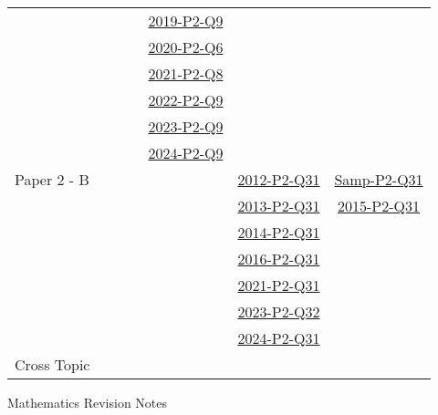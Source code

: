 \documentclass[12pt, a4paper]{article}
\begin{document}
\begin{absolutelynopagebreak}
\begin{center}
\begin{tabular}{|l|c|c|c|c|c|c|}
&  &  &  & \hyperref[DSE2019-CoreP2-Q09]{2019-P2-Q9} &  &  \\
&  &  &  & \hyperref[DSE2020-CoreP2-Q06]{2020-P2-Q6} &  &  \\
&  &  &  & \hyperref[DSE2021-CoreP2-Q08]{2021-P2-Q8} &  &  \\
&  &  &  & \hyperref[DSE2022-CoreP2-Q09]{2022-P2-Q9} &  &  \\
&  &  &  & \hyperref[DSE2023-CoreP2-Q09]{2023-P2-Q9} &  &  \\
&  &  &  & \hyperref[DSE2024-CoreP2-Q09]{2024-P2-Q9} &  &  \\
\hline
Paper 2 - B&  &  &  &  & \hyperref[DSE2012-CoreP2-Q31]{2012-P2-Q31} & \hyperref[DSE2012S-CoreP2-Q31]{Samp-P2-Q31} \\
&  &  &  &  & \hyperref[DSE2013-CoreP2-Q31]{2013-P2-Q31} & \hyperref[DSE2015-CoreP2-Q31]{2015-P2-Q31} \\
&  &  &  &  & \hyperref[DSE2014-CoreP2-Q31]{2014-P2-Q31} &  \\
&  &  &  &  & \hyperref[DSE2016-CoreP2-Q31]{2016-P2-Q31} &  \\
&  &  &  &  & \hyperref[DSE2021-CoreP2-Q31]{2021-P2-Q31} &  \\
&  &  &  &  & \hyperref[DSE2023-CoreP2-Q32]{2023-P2-Q32} &  \\
&  &  &  &  & \hyperref[DSE2024-CoreP2-Q31]{2024-P2-Q31} &  \\
\hline
\hline
Cross Topic&  &  &  &  &  &  \\
\hline
\end{tabular}
\end{center}
\end{absolutelynopagebreak}
\newpage
\newpage
\thispagestyle{empty}
\begin{center}
Mathematics Revision Notes\\\vspace{1cm}
\\\vspace{1cm}
{\fontsize{24pt}{24pt}\selectfont {Exponential Functions \NF}} \\\vspace{1cm}
\label{chapter:S4-6}

\end{center}
\vspace{0.5cm}
\hline
\end{document}
